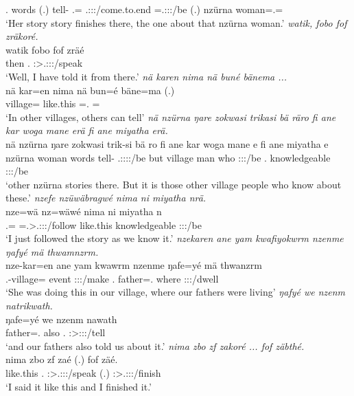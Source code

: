 \begin{exe}
	\Tsg.\Poss{} words (.) \Dem{} tell-\Nmlz{} \Dist.\All=\Only{} \Tsg.\F:\Sbj:\Nonpast:\Ipfv/come.to.end \Emph{} \Med=\Tsg.\F:\Sbj:\Nonpast:\Ipfv/be (.) \Dem{} nzürna woman=\Poss.\Sg=\Char{}\\
	\trans `Her story story finishes there, the one about that nzürna woman.'
	\emph{watik, fobo fof zräkoré.}\\
	\gll watik fobo fof zräé\\
	then \Dist.\All{} \Emph{} \Fsg:\Sbj>\Tsg.\F:\Obj:\Irr:\Pfv/speak\\
	\trans `Well, I have told it from there.'
	\emph{nä karen nima nä buné bänema ...}\\
	\gll nä kar=en nima {nä bun=é} bäne=ma (.)\\
	\Indf{} village=\Loc{} like.this \Indf=\Erg.\Nsg{} \Recog=\Char{}\\
	\trans `In other villages, others can tell'
	\emph{nä nzürna ŋare zokwasi trikasi bä räro fi ane kar woga mane erä fi ane miyatha erä.}\\
	\gll nä nzürna ŋare zokwasi trik-si bä ro fi ane kar woga mane e fi ane miyatha e\\
	\Indf{} nzürna woman words tell-\Nmlz{} \Med{} \Tsg.\F:\Sbj:\Nonpast:\Ipfv:\Andat/be but \Dem{} village man who \Stpl:\Sbj:\Nonpast:\Ipfv/be \Third.\Abs{} \Dem{} knowledgeable \Stpl:\Sbj:\Nonpast:\Ipfv/be\\
	\trans `other nzürna stories there. But it is those other village people who know about these.'
	\emph{nzefe nzüwäbragwé nima ni miyatha nrä.}\\
	\gll nze=wä nz=wäwé nima ni miyatha n\\
	\Fsg.\Erg=\Emph{} \Immpst=\Fsg.\Sbj>\Tsg.\F:\Obj:\Nonpast:\Ipfv/follow like.this \Fnsg{} knowledgeable \Fpl:\Sbj:\Nonpast:\Ipfv/be\\
	\trans `I just followed the story as we know it.'
	\emph{nzekaren ane yam kwafiyokwrm nzenme ŋafyé mä thwamnzrm.}\\
	\gll nze-kar=en ane yam kwawrm nzenme ŋafe=yé mä thwanzrm\\
	\Fnsg.\Poss-village=\Loc{} \Dem{} event \Sg:\Sbj:\Pst:\Dur/make \Fnsg.\Poss{} father=\Abs.\Nsg{} where \Stpl:\Sbj:\Pst:\Dur/dwell\\
	\trans `She was doing this in our village, where our fathers were living'
	\emph{ŋafyé we nzenm natrikwath.}\\
	\gll ŋafe=yé we nzenm nawath\\
	father=\Erg.\Nsg{} also \Fnsg.\Dat{} \Stpl:\Sbj>\Fpl:\Io:\Pst:\Ipfv/tell\\
	\trans `and our fathers also told us about it.'
	\emph{nima zbo zf zakoré ... fof zäbthé.}\\
	\gll nima zbo zf zaé (.) fof zäé.\\
	like.this \Prox.\All{} \Imm{} \Fsg:\Sbj>\Tsg.\F:\Obj:\Rpst:\Pfv/speak (.) \Emph{} \Fsg:\Sbj>\Tsg.\F:\Obj:\Rpst:\Pfv/finish\\
	\trans `I said it like this and I finished it.'	
\end{exe}%